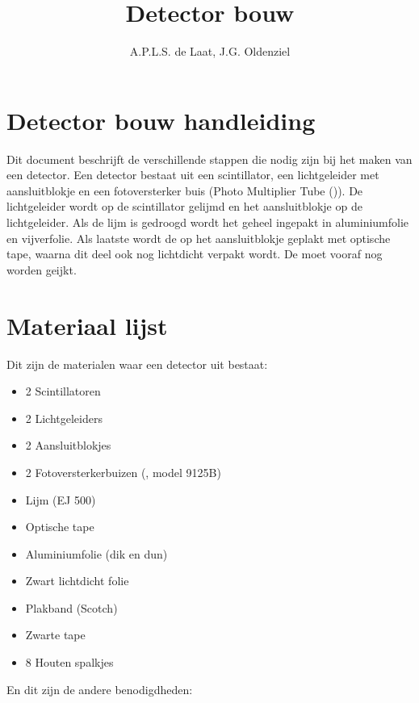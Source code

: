 

\title{Detector bouw}
\author{A.P.L.S. de Laat, J.G. Oldenziel} 



\maketitle

\section{Detector bouw handleiding}

Dit document beschrijft de verschillende stappen die nodig zijn bij het
maken van een \hisparc detector. Een detector bestaat uit een
scintillator, een lichtgeleider met aansluitblokje en een fotoversterker
buis (Photo Multiplier Tube (\pmt)). De lichtgeleider wordt op de
scintillator gelijmd en het aansluitblokje op de lichtgeleider. Als de
lijm is gedroogd wordt het geheel ingepakt in aluminiumfolie en
vijverfolie. Als laatste wordt de \pmt op het aansluitblokje geplakt met
optische tape, waarna dit deel ook nog lichtdicht verpakt wordt. De \pmt
moet vooraf nog worden geijkt.


\section{Materiaal lijst}

Dit zijn de materialen waar een detector uit bestaat:

\begin{itemize}
    \item 2 Scintillatoren
    \item 2 Lichtgeleiders
    \item 2 Aansluitblokjes
    \item 2 Fotoversterkerbuizen (\pmt, model 9125B)
    \item Lijm (EJ 500)
    \item Optische tape
    \item Aluminiumfolie (dik en dun)
    \item Zwart lichtdicht folie
    \item Plakband (Scotch)
    \item Zwarte tape
    \item 8 Houten spalkjes
\end{itemize}

En dit zijn de andere benodigdheden:

